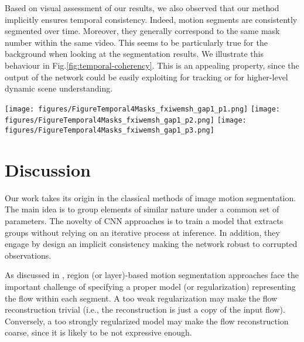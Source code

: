 \documentclass[10pt,twocolumn,letterpaper]{article}
\begin{document}
{\color{black} Based on visual assessment of our results,} we also observed that our method implicitly ensures temporal consistency. Indeed, motion segments are consistently segmented over time. Moreover, they generally correspond to the same mask number within the same video. This {\color{black} seems to be}
particularly true for the background {\color{black} when looking at the segmentation results}. We illustrate this behaviour in Fig.\ref{fig:temporal-coherency}. This is an appealing property, since the output of the network could be easily exploiting for tracking or for higher-level dynamic scene understanding.

\begin{figure*}[tbh!]
\texttt{[image: figures/FigureTemporal4Masks\_fxiwemsh\_gap1\_p1.png]}
\texttt{[image: figures/FigureTemporal4Masks\_fxiwemsh\_gap1\_p2.png]}
\texttt{[image: figures/FigureTemporal4Masks\_fxiwemsh\_gap1\_p3.png]}
\vspace{-0.5cm}
\caption{Illustration of the implicit temporal consistency ensured by our method with four masks. For each group, first row: input optical flow fields displayed with the HSV color code, second row: OFS maps. The color code is the same for all segmentation maps (dark blue: mask 1, light blue: mask 2, green: mask 3, yellow: mask 4). Examples are drawn from DAVIS2016 (from top to bottom): libby, dance-twirl, car-roundabout.}
\label{fig:temporal-coherency}
\vspace{-0.4cm}
\end{figure*}

\vspace{-0.2cm}
\section{Discussion}
\label{discussion}


Our work takes its origin in the classical methods of image motion segmentation. The main idea is to group elements of similar nature under a common set of parameters. The novelty of CNN approaches is to train a model that extracts groups without relying on an iterative process at inference. In addition, they engage by design an implicit consistency making the network robust to corrupted observations.

As discussed in \cite{yang_unsupervised_2019}, region (or layer)-based motion segmentation approaches face the important challenge of specifying a proper model (or regularization) representing the flow within each segment. A too weak regularization may make the flow reconstruction trivial (i.e., the reconstruction is just a copy of the input flow). Conversely, a too strongly regularized model may make the flow reconstruction coarse, since it is likely to be not expressive enough.
\end{document}
